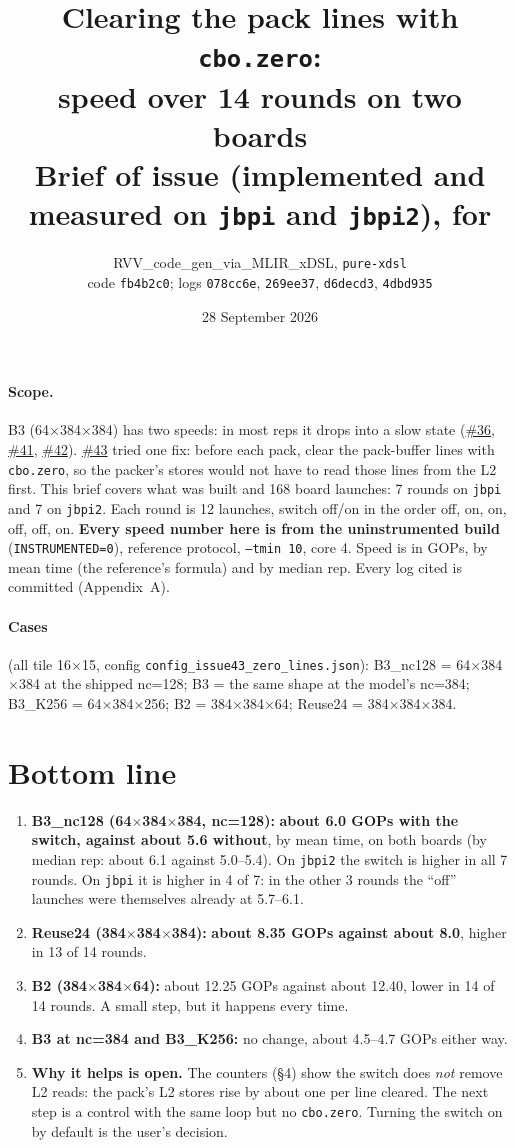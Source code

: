 \documentclass[10pt,a4paper]{article}
\title{\vspace{-1.2cm}\textbf{Clearing the pack lines with \texttt{cbo.zero}:\\ speed over 14 rounds on two boards}\\[2pt]
\large Brief of issue \iss{43} (implemented and measured on \texttt{jbpi} and \texttt{jbpi2}), for \iss{41}}
\author{RVV\_code\_gen\_via\_MLIR\_xDSL, \texttt{pure-xdsl}\\ code \texttt{fb4b2c0}; logs \texttt{078cc6e}, \texttt{269ee37}, \texttt{d6decd3}, \texttt{4dbd935}}
\date{28 September 2026}
\newcommand{\iss}[1]{\href{https://github.com/JieGH/RVV_code_gen_via_MLIR_xDSL/issues/#1}{\##1}}
\newcommand{\down}[1]{\textcolor{blue!60!black}{#1}}
\newcommand{\good}[1]{\textcolor{green!45!black}{\textbf{#1}}}
\begin{document}
\maketitle
\vspace{-0.8cm}

\paragraph{Scope.} B3 (64$\times$384$\times$384) has two speeds: in most reps it drops into a slow state
(\iss{36}, \iss{41}, \iss{42}). \iss{43} tried one fix: before each pack, clear the pack-buffer lines with
\texttt{cbo.zero}, so the packer's stores would not have to read those lines from the L2 first. This brief covers
what was built and 168 board launches: 7 rounds on \texttt{jbpi} and 7 on \texttt{jbpi2}. Each round is 12 launches,
switch off/on in the order off, on, on, off, off, on. \textbf{Every speed number here is from the uninstrumented
build} (\texttt{INSTRUMENTED=0}), reference protocol, \texttt{--tmin 10}, core 4. Speed is in GOPs, by mean time
(the reference's formula) and by median rep. Every log cited is committed (Appendix~A).

\paragraph{Cases} (all tile 16$\times$15, config \texttt{config\_issue43\_zero\_lines.json}):
B3\_nc128 = 64$\times$384$\times$384 at the shipped nc=128;
B3 = the same shape at the model's nc=384;
B3\_K256 = 64$\times$384$\times$256;
B2 = 384$\times$384$\times$64;
Reuse24 = 384$\times$384$\times$384.

\section{Bottom line}
\begin{enumerate}
  \item \textbf{B3\_nc128 (64$\times$384$\times$384, nc=128):} \good{about 6.0 GOPs with the switch, against about
  5.6 without}, by mean time, on both boards (by median rep: about 6.1 against 5.0--5.4). On \texttt{jbpi2} the switch
  is higher in all 7 rounds. On \texttt{jbpi} it is higher in 4 of 7: in the other 3 rounds the ``off'' launches
  were themselves already at 5.7--6.1.
  \item \textbf{Reuse24 (384$\times$384$\times$384):} \good{about 8.35 GOPs against about 8.0}, higher in 13 of 14
  rounds.
  \item \textbf{B2 (384$\times$384$\times$64):} \down{about 12.25 GOPs against about 12.40}, lower in 14 of 14
  rounds. A small step, but it happens every time.
  \item \textbf{B3 at nc=384 and B3\_K256:} no change, about 4.5--4.7 GOPs either way.
  \item \textbf{Why it helps is open.} The counters (\S4) show the switch does \emph{not} remove L2 reads: the
  pack's L2 stores rise by about one per line cleared. The next step is a control with the same loop but
  no \texttt{cbo.zero}. Turning the switch on by default is the user's decision.
\end{enumerate}
\end{document}
